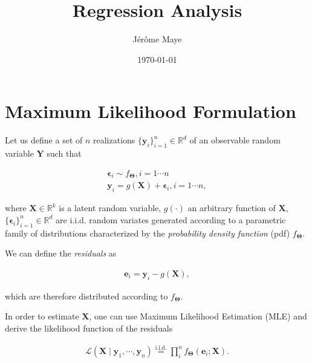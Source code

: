 \documentclass[12pt]{article}
\title{Regression Analysis}
\author{J\'{e}r\^{o}me Maye}
\date{\today}
\begin{document}
  \maketitle

  \section{Maximum Likelihood Formulation}

  Let us define a set of $n$ realizations
  $\{\mathbf{y}_i\}_{i=1}^n\in\mathbb{R}^d$ of an
  observable random variable $\mathbf{Y}$ such that

  \begin{equation}\label{eqn:gencondmodel}
    \begin{aligned}
      \boldsymbol{\epsilon}_i \sim f_{\boldsymbol{\Theta}}, i = 1\cdots n\\
      \mathbf{y}_i = g(\mathbf{X}) + \boldsymbol{\epsilon}_i, i=1\cdots n,
    \end{aligned}
  \end{equation}

  \noindent where $\mathbf{X}\in\mathbb{R}^k$ is a latent random variable,
  $g(\cdot)$ an arbitrary function of $\mathbf{X}$,
  $\{\boldsymbol{\epsilon}_i\}_{i=1}^n\in\mathbb{R}^d$ are i.i.d. random
  variates generated according to a parametric family of distributions
  characterized by the \emph{probability density function} (pdf)
  $f_{\boldsymbol{\Theta}}$.

  We can define the \emph{residuals} as

  \begin{equation}\label{eqn:residuals}
    \begin{aligned}
      \mathbf{e}_i = \mathbf{y}_i - g(\mathbf{X}),
    \end{aligned}
  \end{equation}

  \noindent which are therefore distributed according to 
  $f_{\boldsymbol{\Theta}}$.

  In order to estimate $\mathbf{X}$, one can use Maximum Likelihood Estimation
  (MLE) and derive the likelihood function of the residuals

  \begin{equation}\label{eqn:likelihoodfun}
    \begin{aligned}
      \mathcal{L}(\mathbf{X}\mid \mathbf{y}_1,\cdots,\mathbf{y}_n)
        \stackrel{\mathrm{i.i.d.}}{=}
        \prod_i^n f_{\boldsymbol{\Theta}}(\mathbf{e}_i;\mathbf{X}).
    \end{aligned}
  \end{equation}
\end{document}
